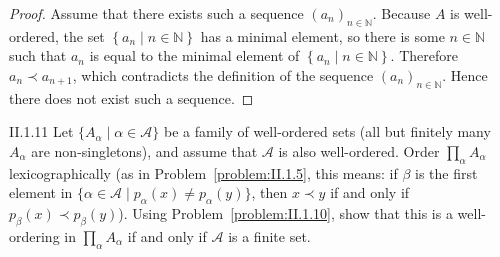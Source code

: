 \begin{proof}
	Assume that there exists such a sequence \( {(a_{n})}_{n\in\mathbb{N}} \). Because \( A \) is well-ordered, the set \( \left\{ a_{n} \mid n \in \mathbb{N} \right\} \) has a minimal element, so there is some \( n \in \mathbb{N} \) such that \( a_{n} \) is equal to the minimal element of \( \left\{ a_{n} \mid n \in \mathbb{N} \right\} \). Therefore \( a_{n} \prec a_{n+1} \), which contradicts the definition of the sequence \( {(a_{n})}_{n\in\mathbb{N}} \). Hence there does not exist such a sequence.
\end{proof}

\begin{problem}{II.1.11}
Let \(\{A_{\alpha} \mid \alpha \in \mathscr{A}\}\) be a family of well-ordered sets {\color{red} (all but finitely many \( A_{\alpha} \) are non-singletons)}, and assume that \(\mathscr{A}\) is also well-ordered. Order \(\prod_{\alpha} A_\alpha\) lexicographically (as in Problem~\ref{problem:II.1.5}, this means: if \(\beta\) is the first element in \(\{\alpha \in \mathscr{A} \mid p_{\alpha}(x) \neq p_{\alpha}(y)\}\), then \(x \prec y\) if and only if \(p_{\beta}(x) \prec p_{\beta}(y)\)). Using Problem~\ref{problem:II.1.10}, show that this is a well-ordering in \(\prod_{\alpha} A_{\alpha}\) if and only if \(\mathscr{A}\) is a finite set.
\end{problem}

